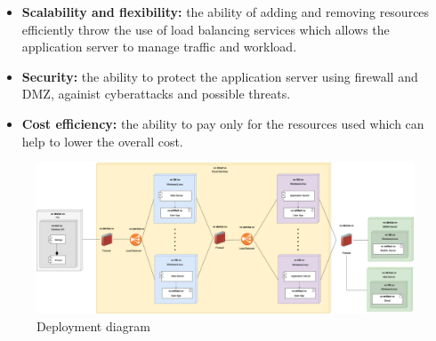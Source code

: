 \begin{itemize}
    \item  \textbf{Scalability and flexibility: }the ability of adding and removing resources efficiently throw 
    the use of load balancing services which allows the application server to manage traffic and workload. 
    \item   \textbf{Security: }the ability to protect the application server using firewall and DMZ, againist cyberattacks and possible threats.
    \item   \textbf{Cost efficiency:} the ability to pay only for the resources used which can help to lower the overall cost. 
\end{itemize}

\begin{figure}[H]
    \centering
    \includegraphics[width=1\textwidth]{images/Deployment_diagram.png}
    \caption{Deployment diagram}
\end{figure}

